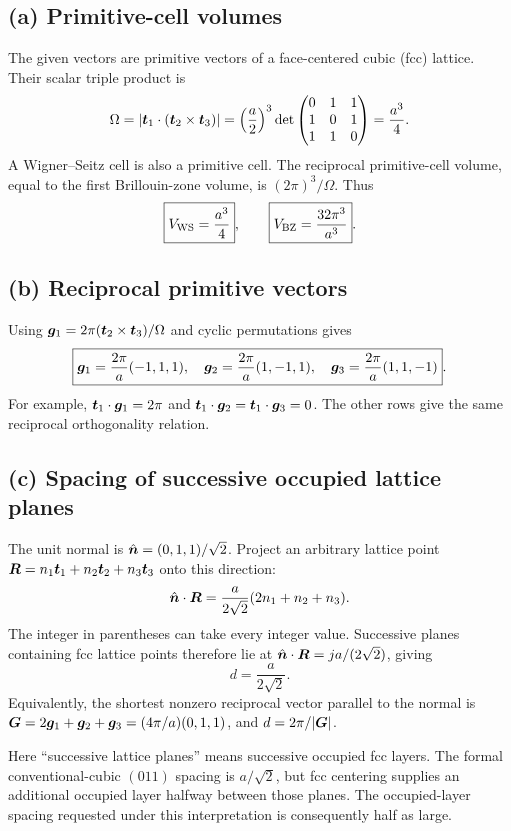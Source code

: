 \subsection*{(a) Primitive-cell volumes}
The given vectors are primitive vectors of a face-centered cubic (fcc) lattice. Their scalar triple product is
\[
\Omega=\left|\boldsymbol{t}_1\cdot(\boldsymbol{t}_2\times\boldsymbol{t}_3)\right|
=\left(\frac a2\right)^3
\det\begin{pmatrix}0&1&1\\1&0&1\\1&1&0\end{pmatrix}
=\frac{a^3}{4}.
\]
A Wigner--Seitz cell is also a primitive cell. The reciprocal primitive-cell volume, equal to the first Brillouin-zone volume, is $(2\pi)^3/\Omega$. Thus
\[
\boxed{V_{\rm WS}=\frac{a^3}{4}},\qquad
\boxed{V_{\rm BZ}=\frac{32\pi^3}{a^3}}.
\]

\subsection*{(b) Reciprocal primitive vectors}
Using $\boldsymbol{g}_1=2\pi(\boldsymbol{t}_2\times\boldsymbol{t}_3)/\Omega$ and cyclic permutations gives
\[
\boxed{\boldsymbol{g}_1=\frac{2\pi}{a}(-1,1,1),\quad
\boldsymbol{g}_2=\frac{2\pi}{a}(1,-1,1),\quad
\boldsymbol{g}_3=\frac{2\pi}{a}(1,1,-1)}.
\]
For example, $\boldsymbol{t}_1\cdot\boldsymbol{g}_1=2\pi$ and
$\boldsymbol{t}_1\cdot\boldsymbol{g}_2=\boldsymbol{t}_1\cdot\boldsymbol{g}_3=0$. The other rows give the same reciprocal orthogonality relation.

\subsection*{(c) Spacing of successive occupied lattice planes}
The unit normal is $\hat{\boldsymbol{n}}=(0,1,1)/\sqrt2$. Project an arbitrary lattice point
$\boldsymbol{R}=n_1\boldsymbol{t}_1+n_2\boldsymbol{t}_2+n_3\boldsymbol{t}_3$ onto this direction:
\[
\hat{\boldsymbol{n}}\cdot\boldsymbol{R}
=\frac{a}{2\sqrt2}(2n_1+n_2+n_3).
\]
The integer in parentheses can take every integer value. Successive planes containing fcc lattice points therefore lie at
$\hat{\boldsymbol{n}}\cdot\boldsymbol{R}=j a/(2\sqrt2)$, giving
\[
\boxed{d=\frac{a}{2\sqrt2}}.
\]
Equivalently, the shortest nonzero reciprocal vector parallel to the normal is
$\boldsymbol{G}=2\boldsymbol{g}_1+\boldsymbol{g}_2+\boldsymbol{g}_3=(4\pi/a)(0,1,1)$, and $d=2\pi/|\boldsymbol{G}|$.
\begin{sourceNote}
Here ``successive lattice planes'' means successive occupied fcc layers. The formal conventional-cubic $(011)$ spacing is $a/\sqrt2$, but fcc centering supplies an additional occupied layer halfway between those planes. The occupied-layer spacing requested under this interpretation is consequently half as large.
\end{sourceNote}

